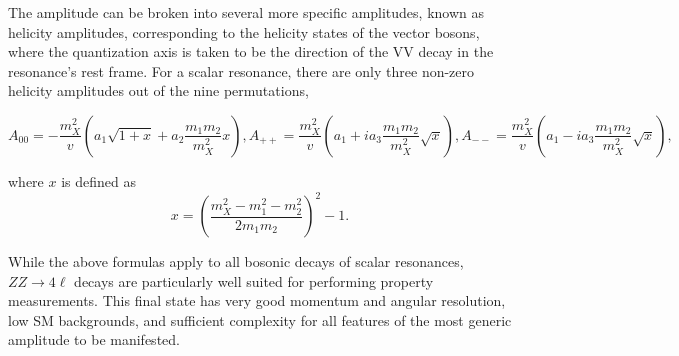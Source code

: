 The amplitude can be broken into several more specific amplitudes, 
known as helicity amplitudes, corresponding to the helicity states 
of the vector bosons, where the quantization axis is taken to be 
the direction of the VV decay in the resonance's rest frame.  For 
a scalar resonance, there are only three non-zero helicity 
amplitudes out of the nine permutations,
\begin{center}
\begin{subequations}
  \begin{equation}
    A_{00} = -\frac{m_X^2}{v}\left(a_1\sqrt{1+x}+a_2\frac{m_1m_2}{m_X^2}x\right),    \end{equation}
  \begin{equation}
    A_{++} = \frac{m_X^2}{v}\left(a_1+ia_3\frac{m_1m_2}{m_X^2}\sqrt{x}\right),
    \end{equation}
  \begin{equation}
    A_{--} = \frac{m_X^2}{v}\left(a_1-ia_3\frac{m_1m_2}{m_X^2}\sqrt{x}\right),
    \end{equation}
\end{subequations}
\end{center}
where $x$ is defined as
\begin{equation}
x=(\frac{m_X^2-m_1^2-m_2^2}{2m_1m_2})^2-1.
\end{equation}

While the above formulas apply to all bosonic decays of 
scalar resonances, $ZZ\to4\ell$ decays are particularly well 
suited for performing property measurements.  This final 
state has very good momentum and angular resolution, low
SM backgrounds, and sufficient complexity for all features
of the most generic amplitude to be manifested.

